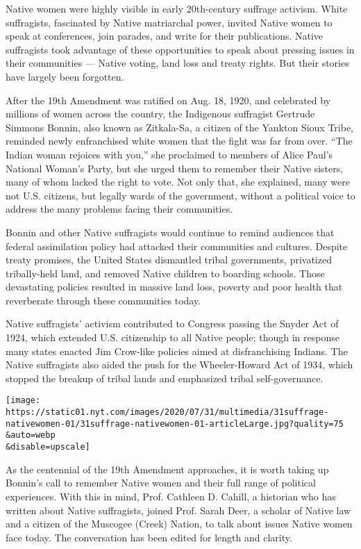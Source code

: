 Native women were highly visible in early 20th-century suffrage
activism. White suffragists, fascinated by Native matriarchal power,
invited Native women to speak at conferences, join parades, and write
for their publications. Native suffragists took advantage of these
opportunities to speak about pressing issues in their communities ---
Native voting, land loss and treaty rights. But their stories have
largely been forgotten.

After the 19th Amendment was ratified on Aug. 18, 1920, and celebrated
by millions of women across the country, the Indigenous suffragist
Gertrude Simmons Bonnin, also known as Zitkala-Sa, a citizen of the
Yankton Sioux Tribe, reminded newly enfranchised white women that the
fight was far from over. ``The Indian woman rejoices with you,'' she
proclaimed to members of Alice Paul's National Woman's Party, but she
urged them to remember their Native sisters, many of whom lacked the
right to vote. Not only that, she explained, many were not U.S.
citizens, but legally wards of the government, without a political voice
to address the many problems facing their communities.

Bonnin and other Native suffragists would continue to remind audiences
that federal assimilation policy had attacked their communities and
cultures. Despite treaty promises, the United States dismantled tribal
governments, privatized tribally-held land, and removed Native children
to boarding schools. Those devastating policies resulted in massive land
loss, poverty and poor health that reverberate through these communities
today.

Native suffragists' activism contributed to Congress passing the Snyder
Act of 1924, which extended U.S. citizenship to all Native people;
though in response many states enacted Jim Crow-like policies aimed at
disfranchising Indians. The Native suffragists also aided the push for
the Wheeler-Howard Act of 1934, which stopped the breakup of tribal
lands and emphasized tribal self-governance.

\texttt{[image: https://static01.nyt.com/images/2020/07/31/multimedia/31suffrage-nativewomen-01/31suffrage-nativewomen-01-articleLarge.jpg?quality=75\\\&auto=webp\\\&disable=upscale]}

As the centennial of the 19th Amendment approaches, it is worth taking
up Bonnin's call to remember Native women and their full range of
political experiences. With this in mind, Prof. Cathleen D. Cahill, a
historian who has written about Native suffragists, joined Prof. Sarah
Deer, a scholar of Native law and a citizen of the Muscogee (Creek)
Nation, to talk about issues Native women face today. The conversation
has been edited for length and clarity.

